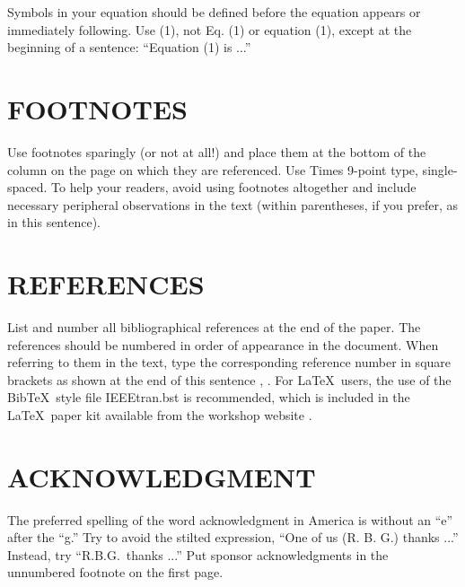 \documentclass{article}
\begin{document}
\begin{sloppy}
Symbols in your equation should be defined before the equation 
appears or immediately following.  Use (1), not Eq. (1) or 
equation (1), except at the beginning of a sentence:  
``Equation (1) is ...''



\section{FOOTNOTES}
\label{sec:foot}

Use footnotes sparingly (or not at all!) and place them at 
the bottom of the column on the page on which they are 
referenced. Use Times 9-point type, single-spaced. To 
help your readers, avoid using footnotes altogether and
include necessary peripheral observations in the text 
(within parentheses, if you prefer, as in this sentence).


\section{REFERENCES}
\label{sec:ref}

List and number all bibliographical references at the end 
of the paper. The references should be numbered in order 
of appearance in the document. When referring to them in 
the text, type the corresponding reference number in 
square brackets as shown at the end of this sentence 
\cite{cJones2003}, \cite{aSmith2000}. For \LaTeX\ users, 
the use of the Bib\TeX\ style file IEEEtran.bst is 
recommended, which is included in the \LaTeX\ paper 
kit available from the workshop website \cite{waspaa17web}.

\section{ACKNOWLEDGMENT}
\label{sec:ack}

The preferred spelling of the word acknowledgment in 
America is without an ``e'' after the ``g.'' Try to avoid 
the stilted expression, ``One of us (R. B. G.) thanks ...''
Instead, try ``R.B.G.\ thanks ...''  Put sponsor 
acknowledgments in the unnumbered footnote on the first page.


\end{sloppy}
\end{document}
